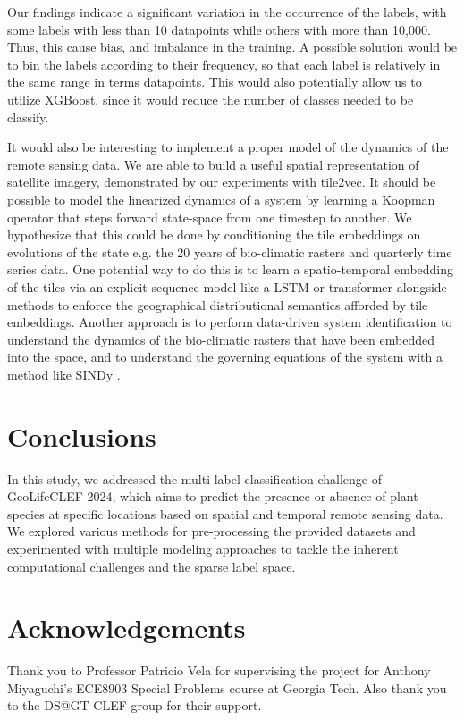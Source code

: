 \documentclass[]{style/ceurart}
\begin{document}
Our findings indicate a significant variation in the occurrence of the labels, with some labels with less than 10 datapoints while others with more than 10,000. Thus, this cause bias, and imbalance in the training. A possible solution would be to bin the labels according to their frequency, so that each label is relatively in the same range in terms datapoints. This would also potentially allow us to utilize XGBoost, since it would reduce the number of classes needed to be classify.

It would also be interesting to implement a proper model of the dynamics of the remote sensing data.
We are able to build a useful spatial representation of satellite imagery, demonstrated by our experiments with tile2vec.
It should be possible to model the linearized dynamics of a system by learning a Koopman operator that steps forward state-space from one timestep to another.
We hypothesize that this could be done by conditioning the tile embeddings on evolutions of the state e.g. the 20 years of bio-climatic rasters and quarterly time series data.
One potential way to do this is to learn a spatio-temporal embedding of the tiles via an explicit sequence model like a LSTM or transformer alongside methods to enforce the geographical distributional semantics afforded by tile embeddings.
Another approach is to perform data-driven system identification to understand the dynamics of the bio-climatic rasters that have been embedded into the space, and to understand the governing equations of the system with a method like SINDy \cite{brunton2016discovering}.

\section{Conclusions}

In this study, we addressed the multi-label classification challenge of GeoLifeCLEF 2024, which aims to predict the presence or absence of plant species at specific locations based on spatial and temporal remote sensing data. 
We explored various methods for pre-processing the provided datasets and experimented with multiple modeling approaches to tackle the inherent computational challenges and the sparse label space.

\section*{Acknowledgements}

Thank you to Professor Patricio Vela for supervising the project for Anthony Miyaguchi's ECE8903 Special Problems course at Georgia Tech.
Also thank you to the DS@GT CLEF group for their support.



\end{document}
